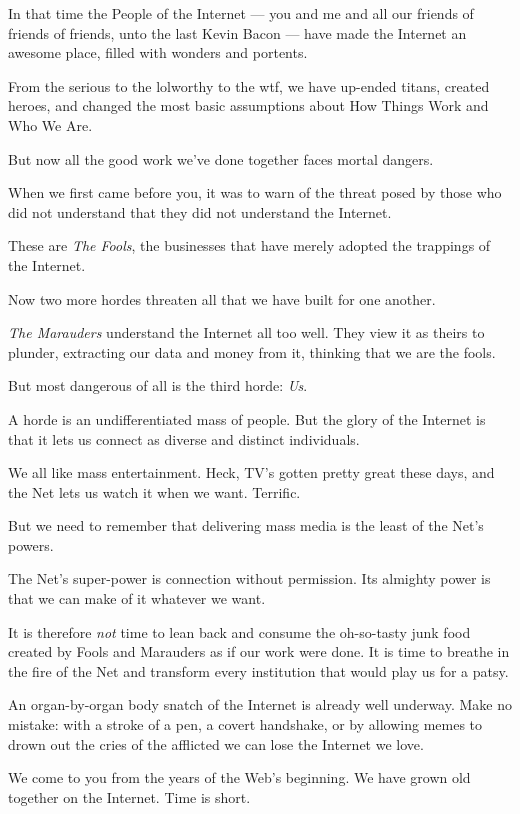 \documentclass[letterpaper,12pt,english]{sphinxmanual}
\begin{document}
In that time the People of the Internet — you and me and all our friends of friends of friends, unto the last Kevin Bacon — have made the Internet an awesome place, filled with wonders and portents.

From the serious to the lolworthy to the wtf, we have up-ended titans, created heroes,  and changed the most basic assumptions about
How Things Work and Who We Are.

But now all the good work we've done together faces mortal dangers.

When we first came before you, it was to warn of the threat posed by those who did not understand that they did not understand the Internet.

These are \emph{The Fools}, the businesses that have merely adopted the trappings of the Internet.

Now two more hordes threaten all that we have built for one another.

\emph{The Marauders} understand the Internet all too well. They view it as theirs to plunder, extracting our data and money from it, thinking that we are the fools.

But most dangerous of all is the third horde: \emph{Us}.

A horde is an undifferentiated mass of people. But the glory of the Internet is that it lets us connect as diverse and distinct individuals.

We all like mass entertainment. Heck, TV's gotten pretty great these days, and the Net lets us watch it when we want. Terrific.

But we need to remember that delivering mass media is the least of the Net's powers.

The Net's super-power is connection without permission. Its almighty power is that we can make of it whatever we want.

It is therefore \emph{not} time to lean back and consume the oh-so-tasty junk food created by Fools and Marauders as if our work were done. It is time to breathe in the fire of the Net and transform every institution that would play us for a patsy.

An organ-by-organ body snatch of the Internet is already well underway. Make no mistake: with a stroke of a pen, a covert handshake, or by allowing memes to drown out the cries of the afflicted we can lose the Internet we love.

We come to you from the years of the Web's beginning. We have grown old together on the Internet. Time is short.
\end{document}
